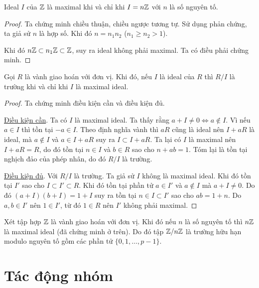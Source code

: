 \begin{corollary}
    Ideal $I$ của $\mathbb{Z}$ là maximal khi và chỉ khi $I = n\mathbb{Z}$ với $n$ là số nguyên tố.
\end{corollary}

\begin{proof}
    Ta chứng minh chiều thuận, chiều ngược tương tự. Sử dụng phản chứng,
    ta giả sử $n$ là hợp số. Khi đó $n = n_1 n_2$ ($n_1 \geq n_2 > 1$).

    Khi đó $n \mathbb{Z} \subset n_1 \mathbb{Z} \subset \mathbb{Z}$, suy ra ideal không phải
    maximal. Ta có điều phải chứng minh.
\end{proof}

\begin{theorem}
    Gọi $R$ là vành giao hoán với đơn vị. Khi đó, nếu $I$ là ideal của $R$ thì $R / I$ là trường khi và chỉ khi $I$ là maximal ideal.
\end{theorem}

\begin{proof}
    Ta chứng minh điều kiện cần và điều kiện đủ.

    \underline{Điều kiện cần}. Ta có $I$ là maximal ideal. Ta thấy rằng
    $a + I \neq 0 \Leftrightarrow a \not\in I$. Vì nếu $a \in I$ thì 
    tồn tại $-a \in I$. Theo định nghĩa vành thì $a R$ cũng là ideal
    nên $I + a R$ là ideal, mà $a \not\in I$ và $a \in I + a R$ suy ra
    $I \subset I + a R$. Ta lại có $I$ là maximal nên $I + aR = R$, 
    do đó tồn tại $n \in I$ và $b \in R$ sao cho $n + ab = 1$. Tóm 
    lại là tồn tại nghịch đảo của phép nhân, do đó $R / I$ là trường.
    
    \underline{Điều kiện đủ}. Với $R / I$ là trường. Ta giả sử $I$ không là
    maximal ideal. Khi đó tồn tại $I'$ sao cho $I \subset I' \subset R$.
    Khi đó tồn tại phần tử $a \in I'$ và $a \not\in I$ mà $a + I \neq 0$.
    Do đó $(a + I) (b + I) = 1 + I$ suy ra tồn tại $n \in I \subset I'$ 
    sao cho $a b = 1 + n$. Do $a, b \in I'$ nên $1 \in I'$, từ đó
    $1 \in R$ nên $I'$ không phải maximal.
\end{proof}

\begin{example}
    Xét tập hợp $\mathbb{Z}$ là vành giao hoán với đơn vị. Khi đó nếu $n$ là số nguyên tố thì $n \mathbb{Z}$ là maximal ideal (đã chứng minh ở trên). Do đó tập $\mathbb{Z} / n\mathbb{Z}$ là trường hữu hạn modulo nguyên tố gồm các phần tử $\{ 0, 1, \ldots, p-1 \}$.
\end{example}

\section{Tác động nhóm}

